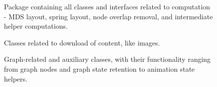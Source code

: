 \begin{figure}[H]
  \centering
  \caption{Package containing all classes and interfaces related to computation - MDS layout, spring layout, node overlap removal, and intermediate helper computations.}
  \label{fig:package-computation}
\end{figure}

\begin{figure}[H]
  \centering
  \caption{Classes related to download of content, like images.}
  \label{fig:package-download}
\end{figure}

\begin{figure}[H]
  \centering
  \caption{Graph-related and auxiliary classes, with their functionality ranging from graph nodes and graph state retention to animation state helpers.}
  \label{fig:package-graph}
\end{figure}

